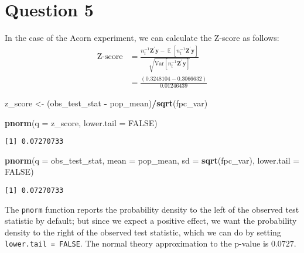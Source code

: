 \documentclass[
  12pt,
  leqno]{article}
\newenvironment{Shaded}{\begin{snugshade}}{\end{snugshade}}
\newcommand{\DataTypeTok}[1]{\textcolor[rgb]{0.13,0.29,0.53}{#1}}
\newcommand{\KeywordTok}[1]{\textcolor[rgb]{0.13,0.29,0.53}{\textbf{#1}}}
\newcommand{\NormalTok}[1]{#1}
\newcommand{\OperatorTok}[1]{\textcolor[rgb]{0.81,0.36,0.00}{\textbf{#1}}}
\newcommand{\OtherTok}[1]{\textcolor[rgb]{0.56,0.35,0.01}{#1}}
\newcommand{\StringTok}[1]{\textcolor[rgb]{0.31,0.60,0.02}{#1}}
\DeclareMathOperator{\E}{\mathbb{E}}
\begin{document}
\section*{Question 5}

In the case of the Acorn experiment, we can calculate the Z-score as
follows: \begin{align*}
\text{Z-score} & = \frac{n_t^{-1}\mathbf{Z}^{\prime}\mathbf{y} - \E\left[n_t^{-1}\mathbf{Z}^{\prime}\mathbf{y}\right]}{\sqrt{\mathrm{Var}\left[n_t^{-1}\mathbf{Z}^{\prime}\mathbf{y}\right]}} \\
& = \frac{\left(0.3248104 - 0.3066632\right)}{0.01246439}
\end{align*}

\begin{Shaded}
\begin{Highlighting}[]
\NormalTok{z\_score \textless{}{-}}\StringTok{ }\NormalTok{(obs\_test\_stat }\OperatorTok{{-}}\StringTok{ }\NormalTok{pop\_mean)}\OperatorTok{/}\KeywordTok{sqrt}\NormalTok{(fpc\_var)}

\KeywordTok{pnorm}\NormalTok{(}\DataTypeTok{q =}\NormalTok{ z\_score, }\DataTypeTok{lower.tail =} \OtherTok{FALSE}\NormalTok{)}
\end{Highlighting}
\end{Shaded}

\begin{verbatim}
[1] 0.07270733
\end{verbatim}

\begin{Shaded}
\begin{Highlighting}[]
\KeywordTok{pnorm}\NormalTok{(}\DataTypeTok{q =}\NormalTok{ obs\_test\_stat, }\DataTypeTok{mean =}\NormalTok{ pop\_mean, }\DataTypeTok{sd =} \KeywordTok{sqrt}\NormalTok{(fpc\_var), }\DataTypeTok{lower.tail =} \OtherTok{FALSE}\NormalTok{)}
\end{Highlighting}
\end{Shaded}

\begin{verbatim}
[1] 0.07270733
\end{verbatim}

The \texttt{pnorm} function reports the probability density to the left
of the observed test statistic by default; but since we expect a
positive effect, we want the probability density to the right of the
observed test statistic, which we can do by setting
\texttt{lower.tail = FALSE}. The normal theory approximation to the
p-value is \(0.0727\).
\end{document}
